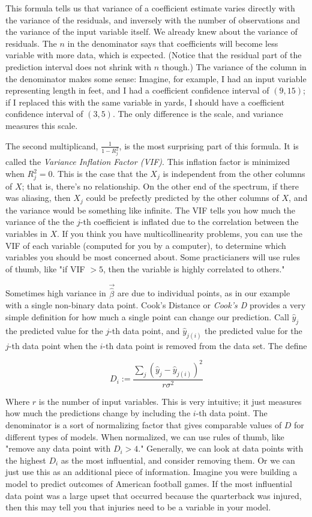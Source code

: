 \documentclass{amsbook}
\begin{document}
This formula tells us that variance of a coefficient estimate varies directly with the variance of the residuals, and inversely with the number of observations and the variance of the input variable itself.  We already knew about the variance of residuals.  The $n$ in the denominator says that coefficients will become less variable with more data, which is expected.  (Notice that the residual part of the prediction interval does not shrink with $n$ though.)  The variance of the column in the denominator makes some sense:  Imagine, for example, I had an input variable representing length in feet, and I had a coefficient confidence interval of $(9, 15)$; if I replaced this with the same variable in yards, I should have a coefficient confidence interval of $(3, 5)$.  The only difference is the scale, and variance measures this scale.

The second multiplicand, $\frac{1}{1-R_j^2}$, is the most surprising part of this formula.  It is called the {\em Variance Inflation Factor (VIF)}.  This inflation factor is minimized when $R_j^2=0$.  This is the case that the $X_j$ is independent from the other columns of $X$; that is, there's no relationship.  On the other end of the spectrum, if there was aliasing, then $X_j$ could be prefectly predicted by the other columns of $X$, and the variance would be something like infinite.  The VIF tells you how much the variance of the the $j$-th coefficient is inflated due to the correlation between the variables in $X$.  If you think you have multicollinearity problems, you can use the VIF of each variable (computed for you by a computer), to determine which variables you should be most concerned about.  Some practicianers will use rules of thumb, like "if VIF $>5$, then the variable is highly correlated to others."

Sometimes high variance in $\vec\hat\beta$ are due to individual points, as in our example with a single non-binary data point.  Cook's Distance or {\em Cook's D} provides a very simple definition for how much a single point can change our prediction.  Call $\hat y_j$ the predicted value for the $j$-th data point, and $\hat y_{j(i)}$ the predicted value for the $j$-th data point when the $i$-th data point is removed from the data set.  The define

$$
D_i:=\frac{\sum_j\left(\hat y_j-\hat y_{j(i)}\right)^2}{r\sigma^2}
$$

Where $r$ is the number of input variables.  This is very intuitive; it just measures how much the predictions change by including the $i$-th data point.  The denominator is a sort of normalizing factor that gives comparable values of $D$ for different types of models.  When normalized, we can use rules of thumb, like "remove any data point with $D_i>4$."  Generally, we can look at data points with the highest $D_i$ as the most influential, and consider removing them.  Or we can just use this as an additional piece of information.  Imagine you were building a model to predict outcomes of American football games.  If the most influential data point was a large upset that occurred because the quarterback was injured, then this may tell you that injuries need to be a variable in your model.
\end{document}
